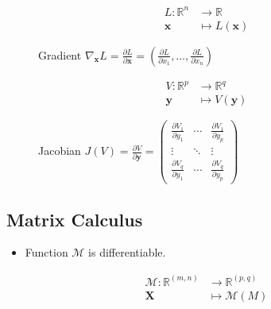 \documentclass{book}
\newcommand{\x}{\mathbf{x}}
\newcommand{\y}{\mathbf{y}}
\newcommand{\X}{\mathbf{X}}
\newcommand{\R}{\mathbb{R}}
\begin{document}
\begin{figure}[h]
    \centering
    \begin{minipage}{.5\textwidth}
        \begin{equation*}
        \begin{split}
        L: \R^n & \longrightarrow \R\\
        \x & \longmapsto L(\x)
        \end{split}
        \end{equation*}
        \begin{myblock}{Gradient}
        \centering
        $\nabla_\x L = \frac{\partial L}{\partial \x} = (\frac{\partial L}{\partial x_1}, \ldots, \frac{\partial L}{\partial x_n}) $
        \end{myblock}
    \end{minipage}%
    \begin{minipage}{.5\textwidth}
        \begin{equation*}
        \begin{split}
        V: \R^p & \longrightarrow \R^q\\
        \y & \longmapsto V(\y)
        \end{split}
        \end{equation*}
        \begin{myblock}{Jacobian}
        \centering
        $J(V) = \frac{\partial V}{\partial \y} =
        \begin{pmatrix}
        \frac{\partial V_1}{\partial y_1} & \cdots & \frac{\partial V_1}{\partial y_p} \\
        \vdots & \ddots & \vdots \\
        \frac{\partial V_q}{\partial y_1} & \cdots & \frac{\partial V_q}{\partial y_p}
        \end{pmatrix}
        $
        \end{myblock}
    \end{minipage}
\end{figure}

\subsection{Matrix Calculus}

\begin{itemize}
\item Function $\mathcal{M}$ is differentiable.
\end{itemize}

\begin{equation*}
\begin{split}
\mathcal{M}: \R^{(m,n)} & \longrightarrow \R^{(p,q)}\\
\X & \longmapsto \mathcal{M}(M)
\end{split}
\end{equation*}
\end{document}
